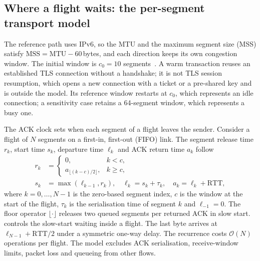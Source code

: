\documentclass[preprint,12pt]{elsarticle}
\begin{document}
\subsection{Where a flight waits: the per-segment transport model}
\label{sec:transport}
The reference path uses IPv6, so the MTU and the maximum segment size (MSS) satisfy $\mathrm{MSS}=\mathrm{MTU}-60$\,bytes, and each direction keeps its own congestion window. The initial window is $c_0=10$ segments~\cite{rfc6928,rfc5681}. A warm transaction reuses an established TLS connection without a handshake; it is not TLS session resumption, which opens a new connection with a ticket or a pre-shared key and is outside the model. Its reference window restarts at $c_0$, which represents an idle connection; a sensitivity case retains a 64-segment window, which represents a busy one.

The ACK clock sets when each segment of a flight leaves the sender. Consider a flight of $N$ segments on a first-in, first-out (FIFO) link. The segment release time $r_k$, start time $s_k$, departure time $\ell_k$ and ACK return time $a_k$ follow
\begin{equation}
\begin{split}
r_k&=\begin{cases}0,& k<c,\\a_{\lfloor(k-c)/2\rfloor},&k\ge c,\end{cases}\\
s_k&=\max(\ell_{k-1},r_k),\quad
\ell_k=s_k+\tau_k,\quad a_k=\ell_k+\mathrm{RTT},
\end{split}
\label{eq:flight}
\end{equation}
where $k=0,\dots,N-1$ is the zero-based segment index, $c$ is the window at the start of the flight, $\tau_k$ is the serialisation time of segment $k$ and $\ell_{-1}=0$. The floor operator $\lfloor\cdot\rfloor$ releases two queued segments per returned ACK in slow start.  controls the slow-start waiting inside a flight. The last byte arrives at $\ell_{N-1}+\mathrm{RTT}/2$ under a symmetric one-way delay. The recurrence costs $\mathcal{O}(N)$ operations per flight. The model excludes ACK serialisation, receive-window limits, packet loss and queueing from other flows.
\end{document}
